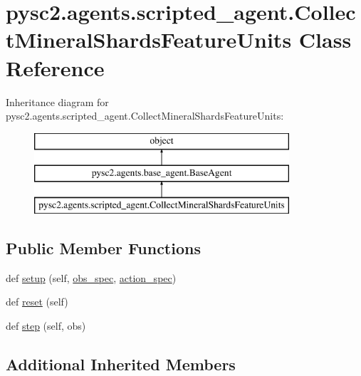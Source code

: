 \hypertarget{classpysc2_1_1agents_1_1scripted__agent_1_1_collect_mineral_shards_feature_units}{}\section{pysc2.\+agents.\+scripted\+\_\+agent.\+Collect\+Mineral\+Shards\+Feature\+Units Class Reference}
\label{classpysc2_1_1agents_1_1scripted__agent_1_1_collect_mineral_shards_feature_units}
Inheritance diagram for pysc2.\+agents.\+scripted\+\_\+agent.\+Collect\+Mineral\+Shards\+Feature\+Units\+:\begin{figure}[H]
\begin{center}
\leavevmode
\includegraphics[height=3.000000cm]{classpysc2_1_1agents_1_1scripted__agent_1_1_collect_mineral_shards_feature_units}
\end{center}
\end{figure}
\subsection*{Public Member Functions}
\begin{DoxyCompactItemize}
\item 
def \mbox{\hyperlink{classpysc2_1_1agents_1_1scripted__agent_1_1_collect_mineral_shards_feature_units_a6f486dbd7973e7d925e70e72ffe44aff}{setup}} (self, \mbox{\hyperlink{classpysc2_1_1agents_1_1base__agent_1_1_base_agent_ad6cefb81724b9d234887cea543c4f06e}{obs\+\_\+spec}}, \mbox{\hyperlink{classpysc2_1_1agents_1_1base__agent_1_1_base_agent_a550b216b98ae40b2da1b2fd9015d3019}{action\+\_\+spec}})
\item 
def \mbox{\hyperlink{classpysc2_1_1agents_1_1scripted__agent_1_1_collect_mineral_shards_feature_units_a46a2b6dc43b5fd8e535505d25a29ea1d}{reset}} (self)
\item 
def \mbox{\hyperlink{classpysc2_1_1agents_1_1scripted__agent_1_1_collect_mineral_shards_feature_units_ac09e7d23c9cc9ad8b7a26c42561bd4b0}{step}} (self, obs)
\end{DoxyCompactItemize}
\subsection*{Additional Inherited Members}



